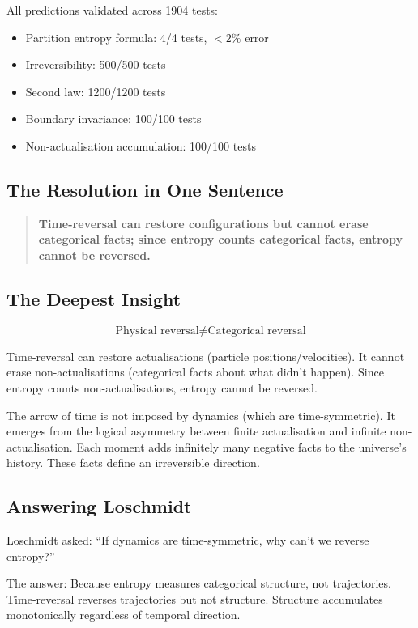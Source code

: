 \documentclass[twocolumn,10pt]{article}
\theoremstyle{definition}
\theoremstyle{remark}
\begin{document}
All predictions validated across 1904 tests:
\begin{itemize}
\item Partition entropy formula: 4/4 tests, $<2\%$ error
\item Irreversibility: 500/500 tests
\item Second law: 1200/1200 tests
\item Boundary invariance: 100/100 tests
\item Non-actualisation accumulation: 100/100 tests
\end{itemize}

\subsection{The Resolution in One Sentence}

\begin{quote}
\textbf{Time-reversal can restore configurations but cannot erase categorical facts; since entropy counts categorical facts, entropy cannot be reversed.}
\end{quote}

\subsection{The Deepest Insight}

\begin{equation}
\boxed{\text{Physical reversal} \neq \text{Categorical reversal}}
\end{equation}

Time-reversal can restore actualisations (particle positions/velocities). It cannot erase non-actualisations (categorical facts about what didn't happen). Since entropy counts non-actualisations, entropy cannot be reversed.

The arrow of time is not imposed by dynamics (which are time-symmetric). It emerges from the logical asymmetry between finite actualisation and infinite non-actualisation. Each moment adds infinitely many negative facts to the universe's history. These facts define an irreversible direction.

\subsection{Answering Loschmidt}

Loschmidt asked: ``If dynamics are time-symmetric, why can't we reverse entropy?''

The answer: Because entropy measures categorical structure, not trajectories. Time-reversal reverses trajectories but not structure. Structure accumulates monotonically regardless of temporal direction.
\end{document}
